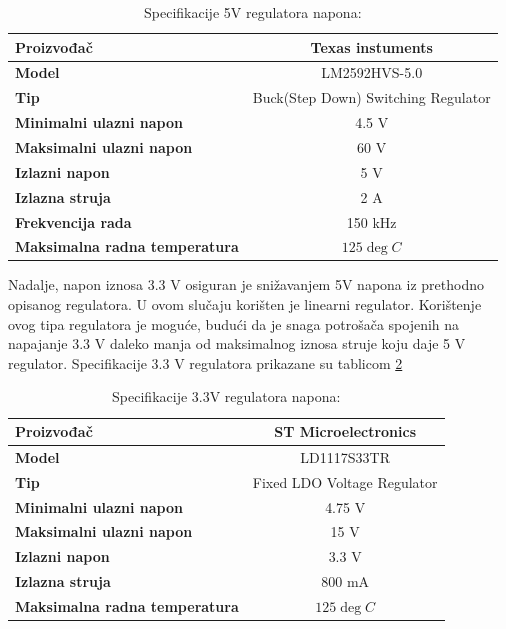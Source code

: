 \documentclass[11pt,a4paper]{article}
\begin{document}
\begin{table}[H]
	\centering
	\caption{Specifikacije 5V regulatora napona: }
	\label{tab:specifikacija_5V}
	\begin{tabular}{|l|c|}
		\hline
		\textbf{Proizvođač} & Texas instuments  \\ \hline 
		\textbf{Model} &  LM2592HVS-5.0  \\ \hline 
		\textbf{Tip} &  Buck(Step Down) Switching Regulator  \\ \hline 
		\textbf{Minimalni ulazni napon} & 4.5 V \\ \hline 
		\textbf{Maksimalni ulazni napon} & 60 V \\ \hline 
		\textbf{Izlazni napon} & 5 V \\ \hline 
		\textbf{Izlazna struja} & 2 A \\ \hline 
		\textbf{Frekvencija rada} & 150 kHz \\ \hline 
		\textbf{Maksimalna radna temperatura} & $125 \deg C$ \\ \hline 
	\end{tabular}
\end{table}

Nadalje, napon iznosa 3.3 V osiguran je snižavanjem 5V napona iz prethodno opisanog regulatora. U ovom slučaju korišten je linearni regulator. Korištenje ovog tipa regulatora je moguće, budući da je snaga potrošača spojenih na napajanje 3.3 V daleko manja od maksimalnog iznosa struje koju daje 5 V regulator. Specifikacije 3.3 V regulatora prikazane su tablicom \ref{tab:specifikacija_3V3}

\begin{table}[H]
	\centering
	\caption{Specifikacije 3.3V regulatora napona: }
	\label{tab:specifikacija_3V3}
	\begin{tabular}{|l|c|}
		\hline
		\textbf{Proizvođač} & ST Microelectronics \\ \hline 
		\textbf{Model} &  LD1117S33TR \\ \hline 
		\textbf{Tip} &  Fixed LDO Voltage Regulator  \\ \hline 
		\textbf{Minimalni ulazni napon} & 4.75 V \\ \hline 
		\textbf{Maksimalni ulazni napon} & 15 V \\ \hline 
		\textbf{Izlazni napon} & 3.3 V \\ \hline 
		\textbf{Izlazna struja} & 800 mA \\ \hline 
		\textbf{Maksimalna radna temperatura} & $125 \deg C$ \\ \hline 
	\end{tabular}
\end{table}
\end{document}
